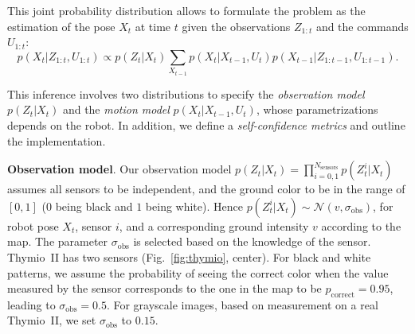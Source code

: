 \documentclass{svmult}
\newcommand{\fig}[1]{Fig.~\ref{fig:#1}}
\begin{document}
This joint probability distribution allows to formulate the problem as the estimation of the pose $X_t$ at time $t$ given the observations $Z_{1:t}$ and the commands $U_{1:t}$:
\begin{equation}
p(X_t|Z_{1:t},U_{1:t}) \propto p(Z_t | X_t) \sum_{X_{t-1}} p(X_t|X_{t-1}, U_t) p(X_{t-1} | Z_{1:t-1}, U_{1:t-1}).
\end{equation}

This inference involves two distributions to specify the \emph{observation model} $p(Z_t | X_t)$ and the \emph{motion model} $p(X_t|X_{t-1}, U_t)$, whose parametrizations depends on the robot.
In addition, we define a \emph{self-confidence metrics} and outline the implementation.


\textbf{Observation model}.
Our observation model $p(Z_t | X_t) = \prod_{i=0,1}^{N_\mathrm{sensors}} p(Z_t^{i} | X_t)$ assumes all sensors to be independent, and the ground color to be in the range of $[0,1]$ ($0$ being black and $1$ being white).
Hence $p(Z_t^{i} | X_t) \sim \mathcal{N}(v,\sigma_\mathrm{obs})$, for robot pose $X_t$, sensor $i$, and a corresponding ground intensity $v$ according to the map.
The parameter $\sigma_\mathrm{obs}$ is selected based on the knowledge of the sensor.
Thymio~II has two sensors (\fig{thymio}, center).
For black and white patterns, we assume the probability of seeing the correct color when the value measured by the sensor corresponds to the one in the map to be $p_\mathrm{correct} = 0.95$, leading to $\sigma_\mathrm{obs} = 0.5$.
For grayscale images, based on measurement on a real Thymio~II, we set $\sigma_\mathrm{obs}$ to $0.15$.
\end{document}
